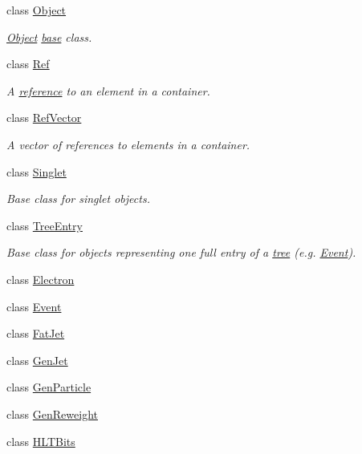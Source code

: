 \begin{DoxyCompactItemize}
class \hyperlink{classpanda_1_1Object}{Object}
\begin{DoxyCompactList}\small\item\em \hyperlink{classpanda_1_1Object}{Object} \hyperlink{namespacepanda_1_1base}{base} class. \item\end{DoxyCompactList}\item 
class \hyperlink{classpanda_1_1Ref}{Ref}
\begin{DoxyCompactList}\small\item\em A \hyperlink{namespacepanda_1_1reference}{reference} to an element in a container. \item\end{DoxyCompactList}\item 
class \hyperlink{classpanda_1_1RefVector}{RefVector}
\begin{DoxyCompactList}\small\item\em A vector of references to elements in a container. \item\end{DoxyCompactList}\item 
class \hyperlink{classpanda_1_1Singlet}{Singlet}
\begin{DoxyCompactList}\small\item\em Base class for singlet objects. \item\end{DoxyCompactList}\item 
class \hyperlink{classpanda_1_1TreeEntry}{TreeEntry}
\begin{DoxyCompactList}\small\item\em Base class for objects representing one full entry of a \hyperlink{namespacepanda_1_1tree}{tree} (e.g. \hyperlink{classpanda_1_1Event}{Event}). \item\end{DoxyCompactList}\item 
class \hyperlink{classpanda_1_1Electron}{Electron}
\item 
class \hyperlink{classpanda_1_1Event}{Event}
\item 
class \hyperlink{classpanda_1_1FatJet}{FatJet}
\item 
class \hyperlink{classpanda_1_1GenJet}{GenJet}
\item 
class \hyperlink{classpanda_1_1GenParticle}{GenParticle}
\item 
class \hyperlink{classpanda_1_1GenReweight}{GenReweight}
\item 
class \hyperlink{classpanda_1_1HLTBits}{HLTBits}

\end{DoxyCompactItemize}
